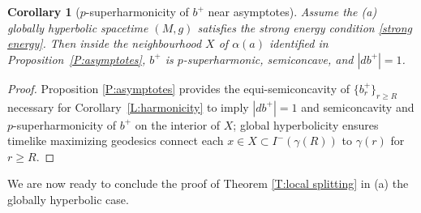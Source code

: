 \documentclass[12pt]{amsart}
\newtheorem{corollary}[theorem]{Corollary}
\begin{document}
\begin{corollary}[$p$-superharmonicity of $b^+$ near asymptotes]
\label{C:asymptotes}
Assume the (a) globally hyperbolic spacetime $(M,g)$ satisfies the strong energy condition \eqref{strong energy}. Then 
inside the neighbourhood $X$ of $\alpha(a)$ identified in Proposition~\ref{P:asymptotes},
$b^+$ is $p$-superharmonic, semiconcave, and $|db^+|=1$.
\end{corollary}

\begin{proof}
Proposition \ref{P:asymptotes} provides the equi-semiconcavity of $\{b^+_r\}_{r \ge R}$ 
necessary for Corollary~\ref{L:harmonicity} to imply $|db^+|=1$ and semiconcavity and $p$-superharmonicity of $b^+$  on the interior of $X$;
global hyperbolicity ensures timelike maximizing geodesics connect each $x \in X \subset I^-(\gamma(R))$ to $\gamma(r)$ for $r \ge R$. 
\end{proof}

We are now ready to conclude the proof of Theorem \ref{T:local splitting} in {(a) the globally hyperbolic} case.
\end{document}
